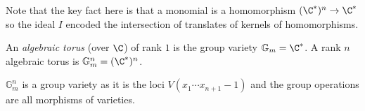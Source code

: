\documentclass[a4paper]{article}
\begin{document}
Note that the key fact here is that a monomial is a homomorphism \((\C^*)^n \to \C^*\) so the ideal \(I\) encoded the intersection of translates of kernels of homomorphisms.

\begin{definition}
  An \emph{algebraic torus} (over \(\C\)) of rank \(1\) is the group variety \(\mathbb G_m = \C^*\). A rank \(n\) algebraic torus is \(\mathbb G_m^n = (\C^*)^n\).
\end{definition}

\begin{remark}
  \(\mathbb G_m^n\) is a group variety as it is the loci \(V(x_1 \cdots x_{n + 1} - 1)\) and the group operations are all morphisms of varieties.
\end{remark}






\iffalse
Multi-index notation: if \(\alpha = (\alpha_1, \dots, \alpha_n) \in \N^n\) then
\[
  X^\alpha = x_1^{\alpha_1} \cdots x_n^{\alpha_n}.
\]
\fi

\printindex
\end{document}
